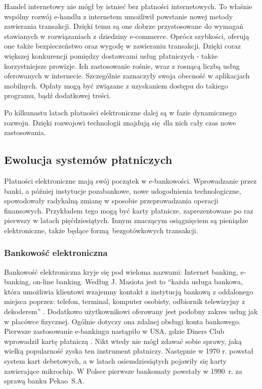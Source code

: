 Handel internetowy nie mógł by istnieć bez płatności internetowych. To właśnie wspólny rozwój e-handlu z internetem umożliwił powstanie nowej metody zawierania transakcji. Dzięki temu są one dobrze przystosowane do wymagań stawianych w rozwiązaniach z dziedziny e-commerce. Oprócz szybkości, oferują one także bezpieczeństwo oraz wygodę w zawieraniu transakcji. Dzięki coraz większej konkurencji pomiędzy dostawcami usług płatniczych - także korzystniejsze prowizje. Ich zastosowanie rośnie, wraz z rosnącą liczbą usług oferowanych w internecie. Szczególnie zaznaczyły swoja obecność w aplikacjach mobilnych. Opłaty mogą być związane z uzyskaniem dostępu do takiego programu, bądź dodatkowej treści.

Po kilkunastu latach płatności elektroniczne dalej są w fazie dynamicznego rozwoju. Dzięki rozwojowi technologii znajdują się dla nich cały czas nowe zastosowania. 


\subsection{Ewolucja systemów płatniczych}

Płatności elektroniczne mają swój początek w e-bankowości. Wprowadzanie przez banki, a później instytucje pozabankowe, nowe udogodnienia technologiczne, spowodowały radykalną zmianę w sposobie przeprowadzania operacji finansowych. Przykładem tego mogą być karty płatnicze, zaprezentowane po raz pierwszy w latach pięćdziesiątych. Innym znaczącym osiągnięciem są pieniądze elektroniczne, także będące formą bezgotówkowych transakcji. 

\subsubsection*{Bankowość elektroniczna}

Bankowość elektroniczna kryje się pod wieloma nazwami: Internet banking, e-banking, on-line banking. Według J. Masiota jest to ``każda usługa bankowa, która umożliwia klientowi wzajemny kontakt z instytucją bankową z oddalonego miejsca poprzez: telefon, terminal, komputer osobisty, odbiornik telewizyjny z dekoderem'' \cite{pieniadz_elektroniczny-analiza}. Dodatkowo użytkownikowi oferowany jest podobny zakres usług jak w placówce fizycznej. Ogólnie dotyczy ona zdalnej obsługi konta bankowego. Pierwsze zastosowanie e-bankingu nastąpiło w USA, gdzie Diners Club wprowadził kartę płatniczą \cite{pieniadz_elektroniczny-analiza}. Nikt wtedy nie mógł zdawać sobie sprawy, jaką wielką popularność zyska ten instrument płatniczy. Następnie w 1970 r. powstał system kart debetowych, a w latach osiemdziesiątych pojawiły się  karty zawierające mikrochip. W Polsce pierwsze bankomaty powstały w 1990~r. za sprawą banku Pekao~S.A.


